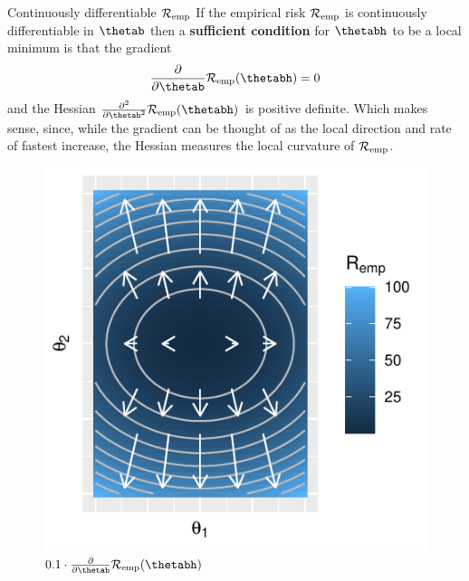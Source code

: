 \documentclass[11pt,compress,t,notes=noshow, xcolor=table]{beamer}
\begin{document}
\begin{vbframe}{Continuously differentiable $\mathcal{R}_{\text{emp}}$}
\footnotesize
If the empirical risk $\mathcal{R}_{\text{emp}}$ is continuously differentiable in $\thetab$ then a \textbf{sufficient condition} for $\thetabh$ to be a local minimum is that the gradient 
\[
\frac{\partial}{\partial\thetab}\riske(\thetabh) = 0
\]
and the Hessian $\frac{\partial^2}{\partial\thetab^2}\riske(\thetabh)$ is positive definite. Which makes sense, since, while the gradient can be thought of as the local direction and rate of fastest increase, the Hessian measures the local curvature of $\mathcal{R}_{\text{emp}}$.

\begin{figure}[!htb]
  \includegraphics[width=\linewidth]{figure/grad}
  \caption*{\footnotesize$0.1\cdot\frac{\partial}{\partial\thetab}\riske(\thetabh)$}
\endminipage\hfill
{}

\end{figure}
\end{vbframe}
\end{document}
